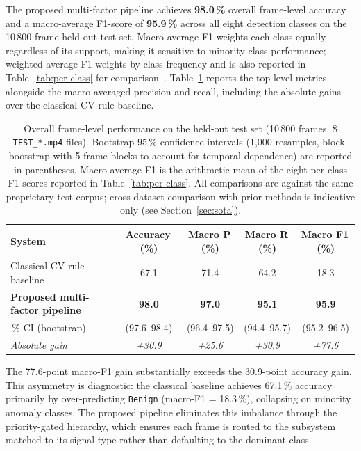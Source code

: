 \documentclass[sensors,article,submit,pdftex,moreauthors]{Definitions/mdpi}
\begin{document}
The proposed multi-factor pipeline achieves \textbf{98.0\,\%} overall
frame-level accuracy and a macro-average F1-score of \textbf{95.9\,\%} across
all eight detection classes on the 10\,800-frame held-out test set.
Macro-average F1 weights each class equally regardless of its support, making it sensitive to minority-class performance; weighted-average F1 weights by class frequency and is also reported in Table~\ref{tab:per-class} for comparison~\cite{manning2008introduction}.
Table~\ref{tab:overall-perf} reports the top-level metrics alongside the
macro-averaged precision and recall, including the absolute gains over the
classical CV-rule baseline.
 
\begin{table}[H]
\caption{Overall frame-level performance on the held-out test set
(10\,800 frames, 8 \texttt{TEST\_*.mp4} files). Bootstrap 95\,\% confidence
intervals (1{,}000 resamples, block-bootstrap with 5-frame blocks to account for
temporal dependence) are reported in parentheses. Macro-average F1 is the
arithmetic mean of the eight per-class F1-scores reported in
Table~\ref{tab:per-class}. All comparisons are against the same proprietary
test corpus; cross-dataset comparison with prior methods is indicative only
(see Section~\ref{sec:sota}).}
\label{tab:overall-perf}
\centering\small\setlength{\tabcolsep}{6pt}
\begin{tabular}{lcccc}
\toprule
\textbf{System} & \textbf{Accuracy\,(\%)} & \textbf{Macro P\,(\%)} &
\textbf{Macro R\,(\%)} & \textbf{Macro F1\,(\%)} \\
\midrule
Classical CV-rule baseline            & 67.1 & 71.4 & 64.2 & 18.3 \\
\textbf{Proposed multi-factor pipeline} & \textbf{98.0} & \textbf{97.0} &
\textbf{95.1} & \textbf{95.9} \\
\quad 95\,\% CI (bootstrap)           & (97.6--98.4) & (96.4--97.5) & (94.4--95.7) & (95.2--96.5) \\
\midrule
\textit{Absolute gain}                & \textit{+30.9} & \textit{+25.6} &
\textit{+30.9} & \textit{+77.6} \\
\bottomrule
\end{tabular}
\end{table}
 
The 77.6-point macro-F1 gain substantially exceeds the 30.9-point accuracy gain. This asymmetry is diagnostic: the classical baseline achieves 67.1\,\% accuracy primarily by over-predicting \texttt{Benign} (macro-F1 = 18.3\,\%), collapsing on minority anomaly classes. The proposed pipeline eliminates this imbalance through the priority-gated hierarchy, which ensures each frame is routed to the subsystem matched to its signal type rather than defaulting to the dominant class.
 
\end{document}
